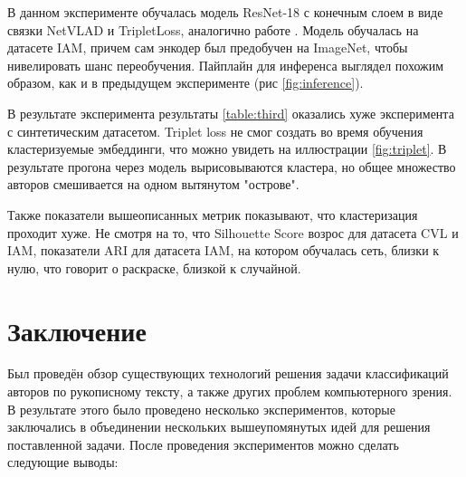 В данном эксперименте обучалась модель ResNet-18 с конечным слоем в виде связки NetVLAD и TripletLoss, аналогично работе \cite{netvlad}. Модель обучалась на датасете IAM, причем сам энкодер был предобучен на ImageNet, чтобы нивелировать шанс переобучения. Пайплайн для инференса выглядел похожим образом, как и в предыдущем эксперименте (рис \ref{fig:inference}). 

В результате эксперимента результаты \ref{table:third} оказались хуже эксперимента с синтетическим датасетом. Triplet loss не смог создать во время обучения кластеризуемые эмбеддинги, что можно увидеть на иллюстрации \ref{fig:triplet}. В результате прогона через модель вырисовываются кластера, но общее множество авторов смешивается на одном вытянутом "острове".

Также показатели вышеописанных метрик показывают, что кластеризация проходит хуже. Не смотря на то, что Silhouette Score возрос для датасета CVL и IAM, показатели ARI для датасета IAM, на котором обучалась сеть, близки к нулю, что говорит о раскраске, близкой к случайной. 

\newpage 
\newpage
\section{Заключение}

Был проведён обзор существующих технологий решения задачи классификаций авторов по рукописному тексту, а также других проблем компьютерного зрения. В результате этого было проведено несколько экспериментов, которые заключались в объединении нескольких вышеупомянутых идей для решения поставленной задачи. После проведения экспериментов можно сделать следующие выводы:

